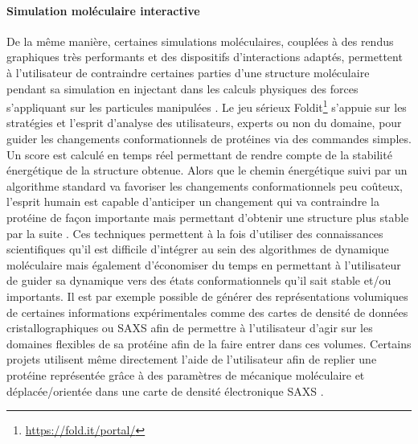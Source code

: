 \paragraph {Simulation moléculaire interactive}

De la même manière, certaines simulations moléculaires, couplées à des rendus graphiques très performants et des dispositifs d'interactions adaptés, permettent à l'utilisateur de contraindre certaines parties d'une structure moléculaire pendant sa simulation en injectant dans les calculs physiques des forces s'appliquant sur les particules manipulées \cite{bolopion_comparing_2010}. Le jeu sérieux Foldit\footnote{\url{https://fold.it/portal/}} s'appuie sur les stratégies et l'esprit d'analyse des utilisateurs, experts ou non du domaine, pour guider les changements conformationnels de protéines via des commandes simples. Un score est calculé en temps réel permettant de rendre compte de la stabilité énergétique de la structure obtenue. Alors que le chemin énergétique suivi par un algorithme standard va favoriser les changements conformationnels peu coûteux, l'esprit humain est capable d'anticiper un changement qui va contraindre la protéine de façon importante mais permettant d'obtenir une structure plus stable par la suite \cite{khatib2011crystal}.
Ces techniques permettent à la fois d'utiliser des connaissances scientifiques qu'il est difficile d'intégrer au sein des algorithmes de dynamique moléculaire mais également d'économiser du temps en permettant à l'utilisateur de guider sa dynamique vers des états conformationnels qu'il sait stable et/ou importants.
Il est par exemple possible de générer des représentations volumiques de certaines informations expérimentales comme des cartes de densité de données cristallographiques ou SAXS afin de permettre à l'utilisateur d'agir sur les domaines flexibles de sa protéine afin de la faire entrer dans ces volumes. Certains projets utilisent même directement l'aide de l'utilisateur afin de replier une protéine représentée grâce à des paramètres de mécanique moléculaire et déplacée/orientée dans une carte de densité électronique SAXS \cite{molza2014innovative,tek2012advances}.

